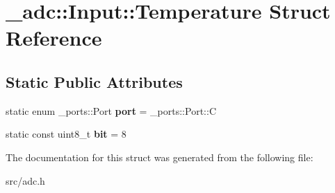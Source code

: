 \hypertarget{struct__adc_1_1Input_1_1Temperature}{}\section{\+\_\+adc\+:\+:Input\+:\+:Temperature Struct Reference}
\label{struct__adc_1_1Input_1_1Temperature}
\subsection*{Static Public Attributes}
\begin{DoxyCompactItemize}
\item 
static enum \+\_\+ports\+::\+Port {\bfseries port} = \+\_\+ports\+::\+Port\+::C\hypertarget{struct__adc_1_1Input_1_1Temperature_ab542707282eed392dd42c6286f4de9c9}{}\label{struct__adc_1_1Input_1_1Temperature_ab542707282eed392dd42c6286f4de9c9}

\item 
static const uint8\+\_\+t {\bfseries bit} = 8\hypertarget{struct__adc_1_1Input_1_1Temperature_adc07113150df21909ad50641df0bbe32}{}\label{struct__adc_1_1Input_1_1Temperature_adc07113150df21909ad50641df0bbe32}

\end{DoxyCompactItemize}


The documentation for this struct was generated from the following file\+:\begin{DoxyCompactItemize}
\item 
src/adc.\+h\end{DoxyCompactItemize}
